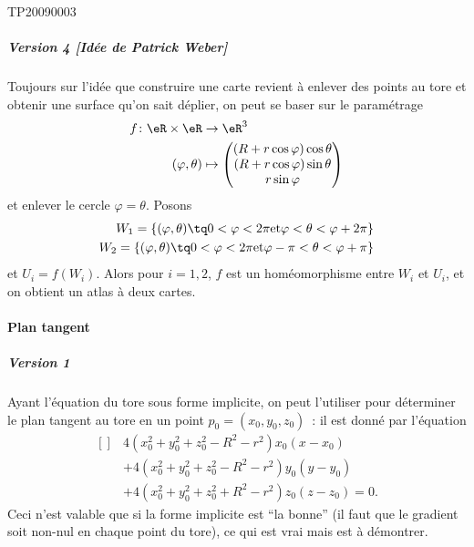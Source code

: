 \begin{corrige}{TP20090003}
	\subparagraph{Version 4 [Idée de Patrick Weber]}
	Toujours sur l'idée que construire une carte revient à enlever des
	points au tore et obtenir une surface qu'on sait déplier, on peut se
	baser sur le paramétrage
	\begin{equation}
		\begin{aligned}
			f\colon \eR\times\eR & \to \eR^3                          \\
			(\varphi,\theta)     & \mapsto \begin{pmatrix}
				                               (R+r\cos\varphi)\cos\theta \\
				                               (R+r\cos\varphi)\sin\theta \\
				                               r\sin\varphi
			                               \end{pmatrix}
		\end{aligned}
	\end{equation}
	et enlever le cercle $\varphi=\theta$. Posons
	\begin{equation*}
		\begin{split}
			W_1 = \{ (\varphi,\theta) \tq 0 < \varphi < 2\pi \text{et}
			\varphi
			< \theta < \varphi + 2\pi \} \\
			W_2 = \{ (\varphi,\theta) \tq 0 < \varphi < 2\pi \text{et}
			\varphi - \pi < \theta < \varphi + \pi \}
		\end{split}
	\end{equation*}
	et $U_i = f(W_i)$. Alors pour $i = 1, 2$, $f$ est un homéomorphisme entre $W_i$ et
	$U_i$, et on obtient un atlas à deux cartes.

	\paragraph{Plan tangent}
	\subparagraph{Version 1}
	Ayant l'équation du tore sous forme implicite, on peut l'utiliser pour
	déterminer le plan tangent au tore en un point $p_0 = (x_0,y_0,z_0)$~:
	il est donné par l'équation
	\begin{equation}
		\begin{aligned}[]
			 & 4 (x_0^2 + y_0^2 + z_0^2 - R^2 - r^2) x_0 (x - x_0)        \\
			 & + 4 (x_0^2 +y_0^2 + z_0^2 - R^2 - r^2) y_0 (y - y_0)       \\
			 & + 4 (x_0^2 + y_0^2 + z_0^2 + R^2 - r^2) z_0 (z - z_0) = 0.
		\end{aligned}
	\end{equation}
	Ceci n'est valable que si la forme implicite est ``la bonne'' (il faut
	que le gradient soit non-nul en chaque point du tore), ce qui est vrai
	mais est à démontrer.


\end{corrige}
